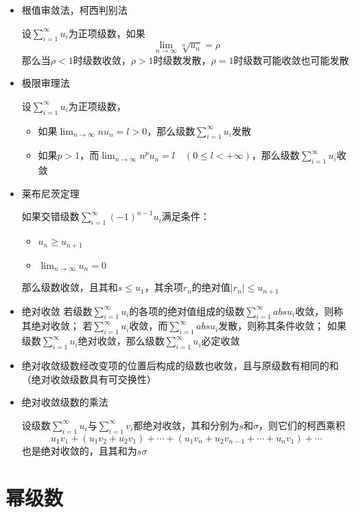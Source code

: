 \documentclass[UTF8]{ctexart}
\newcommand{\abs}[1]{{\left|{#1}\right|}}
\begin{document}
\begin{itemize}
  \item 根值审敛法，柯西判别法

  设$\displaystyle\sum_{i=1}^\infty u_i$为正项级数，如果
  \[\lim_{n\to\infty}\sqrt[n]{u_n}=\rho\]
  那么当$\rho<1$时级数收敛，$\rho>1$时级数发散，$\rho=1$时级数可能收敛也可能发散

  \item 极限审理法

  设$\displaystyle\sum_{i=1}^\infty u_i$为正项级数，
  \begin{itemize}
    \item 如果$\lim_{n\to\infty}nu_n=l>0$，那么级数$\displaystyle\sum_{i=1}^\infty u_i$发散
    \item 如果$p>1$，而$\lim_{n\to\infty}n^pu_n=l\quad(0\le l<+\infty)$，那么级数$\displaystyle\sum_{i=1}^\infty u_i$收敛
  \end{itemize}

  \item 莱布尼茨定理

  如果交错级数$\displaystyle\sum_{i=1}^\infty (-1)^{n-1}u_i$满足条件：
  \begin{itemize}
    \item $u_n\ge u_{n+1}$
    \item $\displaystyle\lim_{n\to\infty}u_n=0$
  \end{itemize}
  那么级数收敛，且其和$s\le u_1$，其余项$r_n$的绝对值$\abs{r_n}\le u_{n+1}$

  \item 绝对收敛
  若级数$\displaystyle\sum_{i=1}^\infty u_i$的各项的绝对值组成的级数$\displaystyle\sum_{i=1}^\infty abs{u_i}$收敛，则称其绝对收敛；
  若$\displaystyle\sum_{i=1}^\infty u_i$收敛，而$\displaystyle\sum_{i=1}^\infty abs{u_i}$发散，则称其条件收敛；
  如果级数$\displaystyle\sum_{i=1}^\infty u_i$绝对收敛，那么级数$\displaystyle\sum_{i=1}^\infty u_i$必定收敛

  \item 绝对收敛级数经改变项的位置后构成的级数也收敛，且与原级数有相同的和（绝对收敛级数具有可交换性）

  \item 绝对收敛级数的乘法

  设级数$\displaystyle\sum_{i=1}^\infty u_i$与$\displaystyle\sum_{i=1}^\infty v_i$都绝对收敛，其和分别为$s$和$\sigma$，则它们的柯西乘积
  \[u_1v_1+(u_1v_2+u_2v_1)+\cdots+(u_1v_n+u_2v_{n-1}+\cdots+u_nv_1)+\cdots\]
  也是绝对收敛的，且其和为$s\sigma$
\end{itemize}

\section*{幂级数}
\end{document}
